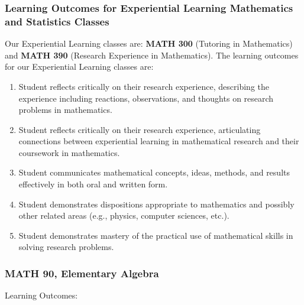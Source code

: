 \documentclass[11pt]{article}
\newenvironment{alphalist}{
\begin{enumerate}[label=(\arabic*),widest=107 ,leftmargin=25pt, itemsep=0pt]}
{\end{enumerate}}
\begin{document}
\subsubsection*{Learning Outcomes for Experiential Learning Mathematics and Statistics Classes}

Our Experiential Learning classes are: \textbf{MATH 300} 
(Tutoring in Mathematics) and \textbf{MATH 390} (Research Experience in Mathematics).
The learning outcomes for our Experiential Learning classes are:
\begin{alphalist}
    \item  Student reflects critically on their research experience, describing the experience including reactions, observations, and thoughts on research problems in mathematics.
\item Student reflects critically on their research experience, articulating connections between experiential learning in mathematical research and their coursework in mathematics.
\item Student communicates mathematical concepts, ideas, methods, and results effectively in both oral and written form. 
\item Student demonstrates dispositions appropriate to mathematics and possibly other related areas (e.g., physics, computer sciences, etc.).
\item Student demonstrates mastery of the practical use of mathematical skills in solving research problems.
\end{alphalist}

\subsubsection*{MATH 90, Elementary Algebra}

Learning Outcomes:
\end{document}
